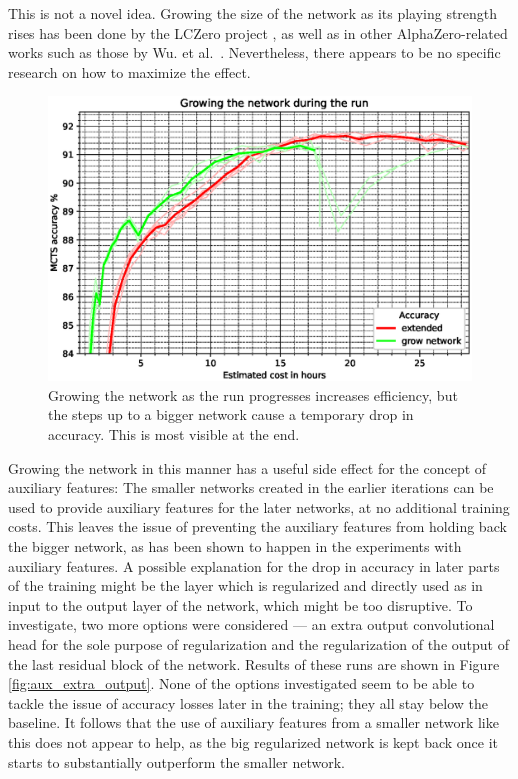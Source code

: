 \documentclass[12pt,onecolumn,oneside,titlepage]{article}
\begin{document}
This is not a novel idea. Growing the size of the network as its playing strength rises has been done by the LCZero project \cite{lzNetworks},
as well as in other AlphaZero-related works such as those by Wu. et al.\ \cite{wu2019accelerating}.
Nevertheless, there appears to be no specific research on how to maximize the effect.

\begin{figure}[H]
\centering
\includegraphics[clip,width=\columnwidth]{growNetwork}
\caption{Growing the network as the run progresses increases efficiency, but the steps up to a bigger network cause a temporary drop in accuracy. This is most visible at the end.}
\label{fig:growNetwork}
\end{figure}

Growing the network in this manner has a useful side effect for the concept of auxiliary features: The smaller networks created in the earlier iterations can be used to provide auxiliary features for the later networks, at no additional training costs.
This leaves the issue of preventing the auxiliary features from holding back the bigger network, as has been shown to happen in the experiments with auxiliary features.
A possible explanation for the drop in accuracy in later parts of the training might be the layer which is regularized and directly used as in input to the output layer of the network, which might be too disruptive. 
To investigate, two more options were considered --- an extra output convolutional head for the sole purpose of regularization and the regularization of the output of the last residual block of the network.
Results of these runs are shown in Figure \ref{fig:aux_extra_output}. None of the options investigated seem to be able to tackle the issue of accuracy losses later in the training; they all stay below the baseline.
It follows that the use of auxiliary features from a smaller network like this does not appear to help, as the big regularized network is kept back once it starts to substantially outperform the smaller network.
\end{document}

